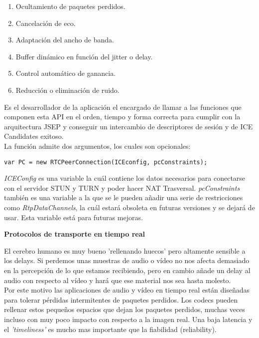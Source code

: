 \begin{enumerate}
\item Ocultamiento de paquetes perdidos.
\item Cancelación de eco.
\item Adaptación del ancho de banda.
\item Buffer dinámico en función del jitter o delay.
\item Control automático de ganancia.
\item Reducción o eliminación de ruido.
\end{enumerate}

Es el desarrollador de la aplicación el encargado de llamar a las funciones que componen esta API en el orden, tiempo y forma correcta para cumplir con la arquitectura JSEP y conseguir un intercambio de descriptores de sesión y de ICE Candidates exitoso.\\

\noindent La función admite dos argumentos, los cuales son opcionales: 

\begin{lstlisting}[caption=Llamada a función RTCPeerConnection]
var PC = new RTCPeerConnection(ICEconfig, pcConstraints);
\end{lstlisting}

\textit{ICEConfig} es una variable la cuál contiene los datos necesarios para conectarse con el servidor STUN y TURN y poder hacer NAT Trasversal. \textit{pcConstraints} también es una variable a la que se le pueden añadir una serie de restricciones como \textit{RtpDataChannels}, la cuál estará obsoleta en futuras versiones y se dejará de usar. Esta variable está para futuras mejoras.\\

\begin{normalsize}
\noindent \textbf{Protocolos de transporte en tiempo real}\\
\end{normalsize}

El cerebro humano es muy bueno 'rellenando huecos' pero altamente sensible a los delays. Si perdemos unas muestras de audio o vídeo no nos afecta demasiado en la percepción de lo que estamos recibiendo, pero en cambio añade un delay al audio con respecto al vídeo y hará que ese material nos sea hasta molesto.\\

Por este motivo las aplicaciones de audio y vídeo en tiempo real están diseñadas para tolerar pérdidas intermitentes de paquetes perdidos. Los codecs pueden rellenar estos pequeños espacios que dejan los paquetes perdidos, muchas veces incluso con muy poco impacto con respecto a la imagen real. Una baja latencia y el \textit{'timeliness'} es mucho mas importante que la fiabilidad (reliability).\\

